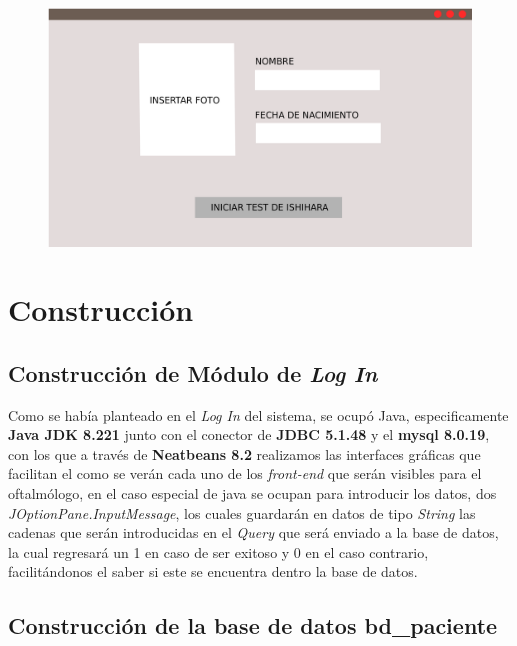 \documentclass[10pt]{article}
\begin{document}
\begin{figure}[H]
	\begin{center}
\includegraphics[scale = 0.20]{Imagenes/Ventana4.png}
	\end{center} 
\end{figure}

\newpage
\section{Construcción}

\subsection{Construcción de Módulo de \textit{Log In}}

Como se había planteado en el \textit{Log In} del sistema, se ocupó Java, especificamente \textbf{Java JDK 8.221} junto con el conector de \textbf{JDBC 5.1.48} y el \textbf{mysql 8.0.19}, con los que a través de \textbf{Neatbeans 8.2} realizamos las interfaces gráficas que facilitan el como se verán cada uno de los \textit{front-end} que serán visibles para el oftalmólogo, en el caso especial de java se ocupan para introducir los datos, dos \textit{JOptionPane.InputMessage}, los cuales guardarán en datos de tipo \textit{String} las cadenas que serán introducidas en el \textit{Query} que será enviado a la base de datos, la cual regresará un 1 en caso de ser exitoso y 0 en el caso contrario, facilitándonos el saber si este se encuentra dentro la base de datos.

\subsection{Construcción de la base de datos bd\_paciente}
\end{document}
